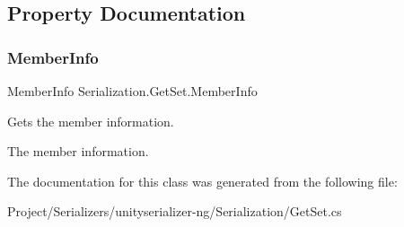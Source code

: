 \subsection{Property Documentation}
\mbox{\label{class_serialization_1_1_get_set_a4a75edb3e7f3b72a0334cf9602adb2a5}} 
\subsubsection{\texorpdfstring{Member\+Info}{MemberInfo}}
{\footnotesize\ttfamily Member\+Info Serialization.\+Get\+Set.\+Member\+Info\hspace{0.3cm}{\ttfamily [get]}}



Gets the member information. 

The member information.

The documentation for this class was generated from the following file\+:\begin{DoxyCompactItemize}
\item 
Project/\+Serializers/unityserializer-\/ng/\+Serialization/Get\+Set.\+cs\end{DoxyCompactItemize}
